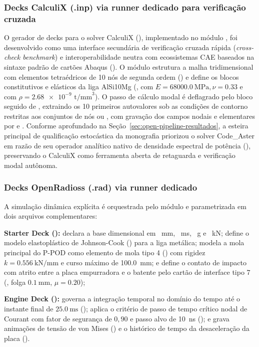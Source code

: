 \subsubsection{Decks CalculiX (.inp) via runner dedicado para verificação cruzada}
\label{subsubsec:calculix}
O gerador de decks para o solver CalculiX (), implementado no módulo , foi desenvolvido como uma interface secundária de verificação cruzada rápida (\textit{cross-check benchmark}) e interoperabilidade neutra com ecossistemas CAE baseados na sintaxe padrão de cartões Abaqus (). O módulo estrutura a malha tridimensional com elementos tetraédricos de 10 nós de segunda ordem () e define os blocos constitutivos e elásticos da liga AlSi10Mg (,  com $E = \SI{68000.0}{\mega\pascal}, \nu = \num{0.33}$ e  com $\rho = \num{2.68e-9}\text{ t/mm}^3$). O passo de cálculo modal é deflagrado pelo bloco  seguido de , extraindo os 10 primeiros autovalores sob as condições de contorno  restritas aos conjuntos de nós  ou , com gravação dos campos nodais e elementares por  e . Conforme aprofundado na Seção~\ref{sec:open-pipeline-resultados}, a esteira principal de qualificação estocástica da monografia priorizou o solver Code\_Aster em razão de seu operador analítico nativo de densidade espectral de potência (), preservando o CalculiX como ferramenta aberta de retaguarda e verificação modal autônoma.

\subsubsection{Decks OpenRadioss (.rad) via runner dedicado}
\label{subsubsec:openradioss}
A simulação dinâmica explícita é orquestrada pelo módulo  e parametrizada em dois arquivos complementares:
\begin{alineas}
  \item \textbf{Starter Deck ():} declara a base dimensional em \SI{}{\milli\metre}, \SI{}{\milli\second}, \SI{}{\gram} e \SI{}{\kilo\newton}; define o modelo elastoplástico de Johnson-Cook () para a liga metálica; modela a mola principal do P-POD como elemento de mola tipo 4 () com rigidez $k = \SI{0.556}{\kilo\newton\per\milli\metre}$ e curso máximo de \SI{100.0}{\milli\metre}; e define o contato de impacto com atrito entre a placa empurradora e o batente pelo cartão de interface tipo 7 (, folga $\SI{0.1}{\milli\metre}$, $\mu = \num{0.20}$);
  \item \textbf{Engine Deck ():} governa a integração temporal no domínio do tempo até o instante final de $\SI{25.0}{\milli\second}$ (); aplica o critério de passo de tempo crítico nodal de Courant com fator de segurança de $0{,}90$ e passo alvo de \SI{10}{\nano\second} (); e grava animações de tensão de von Mises () e o histórico de tempo da desaceleração da placa ().
\end{alineas}

